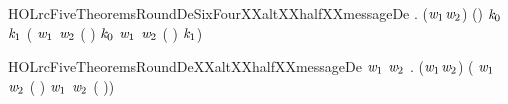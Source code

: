 \newcommand{\HOLrcFiveTheoremsRoundDeYYXXcompute}{\UseVerbatim{HOLrcFiveTheoremsRoundDeYYXXcompute}}
\begin{SaveVerbatim}{HOLrcFiveTheoremsRoundDeSixFourXXaltXXhalfXXmessageDe}
\HOLTokenTurnstile{} \HOLSymConst{\HOLTokenForall{}}  .
     (\ensuremath{\HOLFreeVar{w}\sb{\mathrm{1}}}\HOLSymConst{,}\ensuremath{\HOLFreeVar{w}\sb{\mathrm{2}}}) \HOLSymConst{=}   \HOLSymConst{\HOLTokenConj{}} (\HOLSymConst{,}\HOLSymConst{,}\HOLSymConst{,}\HOLSymConst{,}\HOLSymConst{,}) \HOLSymConst{=}    \HOLSymConst{\HOLTokenConj{}}
     \ensuremath{\HOLFreeVar{k}\sb{\mathrm{0}}} \HOLSymConst{=}    \HOLSymConst{\HOLTokenConj{}} \ensuremath{\HOLFreeVar{k}\sb{\mathrm{1}}} \HOLSymConst{=}    \HOLSymConst{\HOLTokenImp{}}
         \HOLSymConst{=}
       ( \ensuremath{\HOLFreeVar{w}\sb{\mathrm{1}}} \ensuremath{\HOLFreeVar{w}\sb{\mathrm{2}}}  ( \HOLSymConst{\HOLTokenProd{}}  \HOLSymConst{\ensuremath{+}} ) \HOLSymConst{\ensuremath{-}} \ensuremath{\HOLFreeVar{k}\sb{\mathrm{0}}}\HOLSymConst{,}
         \ensuremath{\HOLFreeVar{w}\sb{\mathrm{1}}} \ensuremath{\HOLFreeVar{w}\sb{\mathrm{2}}}  ( \HOLSymConst{\HOLTokenProd{}} ) \HOLSymConst{\ensuremath{-}} \ensuremath{\HOLFreeVar{k}\sb{\mathrm{1}}})
\end{SaveVerbatim}
\newcommand{\HOLrcFiveTheoremsRoundDeSixFourXXaltXXhalfXXmessageDe}{\UseVerbatim{HOLrcFiveTheoremsRoundDeSixFourXXaltXXhalfXXmessageDe}}
\begin{SaveVerbatim}{HOLrcFiveTheoremsRoundDeXXaltXXhalfXXmessageDe}
\HOLTokenTurnstile{} \HOLSymConst{\HOLTokenForall{}}\ensuremath{\HOLBoundVar{w}\sb{\mathrm{1}}} \ensuremath{\HOLBoundVar{w}\sb{\mathrm{2}}}  .
        (\ensuremath{\HOLBoundVar{w}\sb{\mathrm{1}}}\HOLSymConst{,}\ensuremath{\HOLBoundVar{w}\sb{\mathrm{2}}}) \HOLSymConst{=}
     ( \ensuremath{\HOLBoundVar{w}\sb{\mathrm{1}}} \ensuremath{\HOLBoundVar{w}\sb{\mathrm{2}}}  ( \HOLSymConst{\HOLTokenProd{}}  \HOLSymConst{\ensuremath{+}} )\HOLSymConst{,}
       \ensuremath{\HOLBoundVar{w}\sb{\mathrm{1}}} \ensuremath{\HOLBoundVar{w}\sb{\mathrm{2}}}  ( \HOLSymConst{\HOLTokenProd{}} ))
\end{SaveVerbatim}
